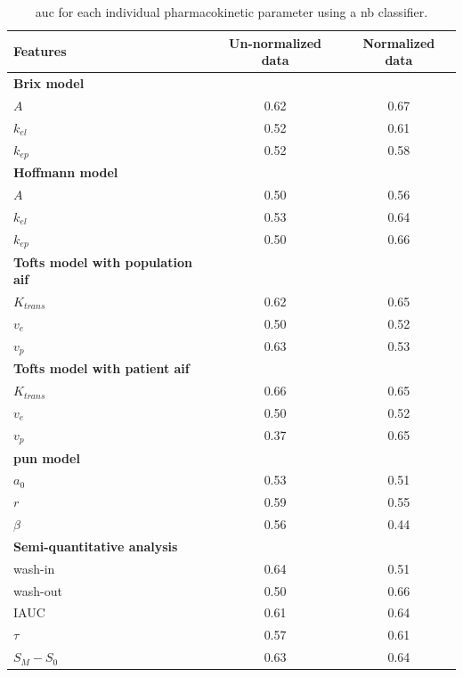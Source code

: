 \begin{table}
  \caption{\acs*{auc} for each individual pharmacokinetic parameter using a \acs*{nb} classifier.}
  \centering
  \begin{tabular}{l c c}
    \toprule
    \textbf{Features} & Un-normalized data & Normalized data \\
    \midrule
    \textbf{Brix model} & & \\
    \quad $A$         & 0.62 & 0.67 \\
    \quad $k_{el}$    & 0.52 & 0.61 \\
    \quad $k_{ep}$    & 0.52 & 0.58 \\
    \textbf{Hoffmann model} & & \\
    \quad $A$         & 0.50 & 0.56 \\
    \quad $k_{el}$    & 0.53 & 0.64 \\
    \quad $k_{ep}$    & 0.50 & 0.66 \\
    \textbf{Tofts model with population \ac{aif}} & & \\
    \quad $K_{trans}$ & 0.62 & 0.65 \\
    \quad $v_{e}$     & 0.50 & 0.52 \\
    \quad $v_{p}$     & 0.63 & 0.53 \\
    \textbf{Tofts model with patient \ac{aif}} & & \\
    \quad $K_{trans}$ & 0.66 & 0.65 \\
    \quad $v_{e}$     & 0.50 & 0.52 \\
    \quad $v_{p}$     & 0.37 & 0.65 \\
    \textbf{\ac{pun} model} & & \\
    \quad $a_0$       & 0.53 & 0.51 \\
    \quad $r$         & 0.59 & 0.55 \\
    \quad $\beta$     & 0.56 & 0.44 \\
    \textbf{Semi-quantitative analysis} & & \\
    \quad wash-in     & 0.64 & 0.51 \\
    \quad wash-out    & 0.50 & 0.66 \\
    \quad IAUC        & 0.61 & 0.64 \\
    \quad $\tau$      & 0.57 & 0.61 \\
    \quad $S_M - S_0$ & 0.63 & 0.64 \\
    \bottomrule
  \end{tabular}
  \label{tab:resfeats}
\end{table}

